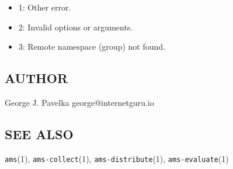 \begin{itemize}
\item
  1: Other error.
\item
  2: Invalid options or arguments.
\item
  3: Remote namespace (group) not found.
\end{itemize}

\subsection{AUTHOR}\label{author-4}

George J. Pavelka george@internetguru.io

\subsection{SEE ALSO}\label{see-also-4}

\texttt{ams}(1), \texttt{ams-collect}(1), \texttt{ams-distribute}(1), \texttt{ams-evaluate}(1)
